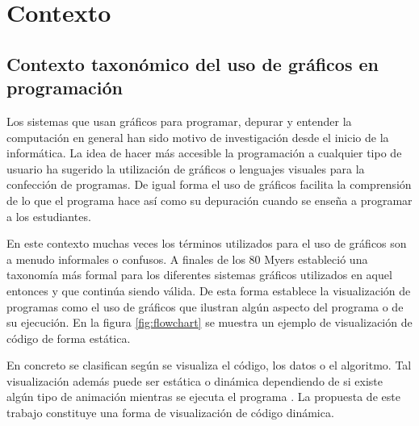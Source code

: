 \documentclass{llncs}
\begin{document}
%
%
\section{Contexto}
\label{sec:background}

\subsection{Contexto taxonómico del uso de gráficos en programación}
\label{subsec:taxonomy}
Los sistemas que usan gráficos para programar, depurar y entender la computación en general han sido motivo de investigación desde el inicio de la informática. La idea de hacer más accesible la programación a cualquier tipo de usuario ha sugerido la utilización de gráficos o lenguajes visuales para la confección de programas. De igual forma el uso de gráficos facilita la comprensión de lo que el programa hace así como su depuración cuando se enseña a programar a los estudiantes. 

En este contexto muchas veces los términos utilizados para el uso de gráficos son a menudo informales o confusos. A finales de los 80 Myers \cite{myers1990taxonomies} estableció una taxonomía más formal para los diferentes sistemas gráficos utilizados en aquel entonces y que continúa siendo válida. De esta forma establece la visualización de programas como el uso de gráficos que ilustran algún aspecto del programa o de su ejecución. En la figura \ref{fig:flowchart} se muestra un ejemplo de visualización de código de forma estática. 

En concreto se clasifican según se visualiza el código, los datos o el algoritmo. Tal visualización además puede ser estática o dinámica dependiendo de si existe algún tipo de animación mientras se ejecuta el programa \cite{urquiza2009survey}. La propuesta de este trabajo constituye una forma de visualización de código dinámica. 
\end{document}
